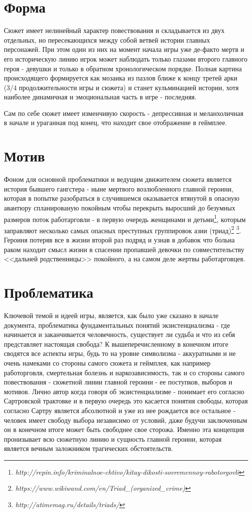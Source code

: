 \documentclass[11pt]{report}
\begin{document}
\newpage
\section{Форма}
Сюжет имеет нелинейный характер повествования и складывается из двух отдельных, но пересекающихся между собой ветвей истории главных персонажей. При этом один из них на момент начала игры уже де-факто мертв и его историческую линию игрок может наблюдать только глазами второго главного героя - девушки и только в обратном хронологическом порядке. Полная картина происходящего формируется как мозаика из пазлов ближе к концу третей арки (3/4 продолжительности игры и сюжета) и станет кульминацией истории, хотя наиболее динамичная и эмоциональная часть в игре - последняя.

Сам по себе сюжет имеет изменчивую скорость - депрессивная и меланхоличная в начале и ураганная под конец, что находит свое отображение в геймплее.

\section{Мотив}
Фоном для основной проблематики и ведущим движителем сюжета является история бывшего гангстера - ныне мертвого возлюбленного главной героини, которая в попытке разобраться в случившемся оказывается втянутой в опасную авантюру спланированую покойным чтобы перекрыть выросший до безумных размеров поток работарговли - в первую очередь женщинами и детьми\footnote{\emph{http://repin.info/kriminalnoe-chtivo/kitay-dikosti-sovremennoy-rabotorgovli}}, которым заправляют несколько самых опасных преступных группировок азии (триад)\footnote{\emph{https://www.wikiwand.com/en/Triad\_(organized\_crime)}} \footnote{\emph{http://atimemag.ru/details/triads/}}. Героиня потеряв все в жизни второй раз подряд и узнав в добавок что больна раком находит смысл жизни в спасении пропавшей девочки по совместительству <<дальней родственницы>> покойного, а на самом деле жертвы работарговцев. 


\section{Проблематика}
Ключевой темой и идеей игры, является, как было уже сказано в начале документа, проблематика фундаментальных понятий экзистенциализма - где начинается и заканчивается человечность, существует ли судьба и что из себя представляет настоящая свобода? К вышеперечисленному в конечном итоге сводятся все аспекты игры, будь то на уровне символизма - аккуратными и не очень намеками со стороны самого сюжета и геймплея, как например работорговля, смертельная болезнь и наркозависимость, так и со стороны самого повествования - сюжетной линии главной героини - ее поступков, выборов и мотивов. Лично автор когда говоря об экзистенциализме - понимает его согласно Сартровской трактовке и в первую очередь это касается понятия свободы, которая согласно Сартру является абсолютной и уже из нее рождается все остальное - человек имеет свободу выбора независимо от условий, даже будучи заключенным он в конечном итоге может быть свободнее свое сторожа. Именно эта концепция пронизывает всю сюжетную линию и сущность главной героини, которая является вечным заложником трагических обстоятельств.
\end{document}
